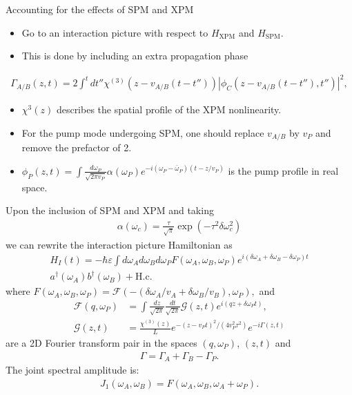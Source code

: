 \documentclass[final]{beamer} %
\newcommand{\hc}{\mathrm{H.c.}}
\begin{document}
\begin{frame}[t]
\begin{columns}[t]
\begin{column}{0.34\paperwidth}
\begin{alertblock}{Accounting for the effects of SPM and XPM}
\begin{itemize}
\item \textcolor{brownish}{Go to an interaction picture with respect to $H_{\text{XPM}}$ and $H_{\text{SPM}}$.}
\item \textcolor{brownish}{This is done by including an extra propagation phase }
\end{itemize}
\begin{align*}
\Gamma_{A/B}(z,t)=2 \int^t dt''\chi^{(3)}(z-v_{A/B} (t-t'')) |\phi_C(z-v_{A/B}(t-t''),t'')|^2,
\end{align*}
\begin{itemize}
\item  $\chi^3(z)$ describes the spatial profile of the XPM nonlinearity. 
\item For the pump mode undergoing SPM, one should replace $v_{A/B}$ by $v_P$ and remove the prefactor of 2.
\item $\phi_P(z,t)=\int \frac{d\omega_P}{\sqrt{2 \pi v_P}} \alpha(\omega_P) e^{-i (\omega_P- \bar \omega_P)(t-z/v_P)}$ is the pump profile in real space.
\end{itemize}
Upon the inclusion of SPM and XPM and taking 
\begin{align*}
\alpha(\omega_c)=\frac{\tau}{\sqrt{\pi}} \exp(-\tau^2 \delta \omega_c^2)
\end{align*} 
we can rewrite the interaction picture Hamiltonian as
\begin{align*}
H_I(t)=-\hbar \varepsilon\int d\omega_A d\omega_B d\omega_P F(\omega_A,\omega_B,\omega_P) e^{i(\delta \omega_A +\delta \omega_B - \delta \omega_P)t} \\
a^\dagger(\omega_A) b^\dagger(\omega_B)+\hc
\end{align*}
where $F(\omega_A,\omega_B,\omega_P)=\mathcal{F}\left(-(\delta \omega_A/v_A+\delta \omega_B/v_B),\omega_P\right),$  and
\begin{align*}
\mathcal{F}(q,\omega_P)&=\int \frac{dz}{\sqrt{2 \pi}} \frac{dt}{\sqrt{2 \pi}} \mathcal{G}(z,t) e^{i (q z + \delta \omega_P t)}, \\ \mathcal{G}(z,t)&= \frac{\chi^{(3)}(z)}{L}  e^{-(z-v_P t)^2/(4 v_P^2 \tau^2)} e^{-i \Gamma(z,t)}
\end{align*}
are a 2D Fourier transform pair in the spaces $(q,\omega_P)$,  $(z,t)$ and 
\begin{align*}
\Gamma=\Gamma_A+\Gamma_B-\Gamma_P.
\end{align*}
The joint spectral amplitude is: 
\begin{align*}
 J_1(\omega_A,\omega_B)=F(\omega_A,\omega_B,\omega_A+\omega_P).
\end{align*}


\end{alertblock}
\end{column}
\end{columns}
\end{frame}
\end{document}
